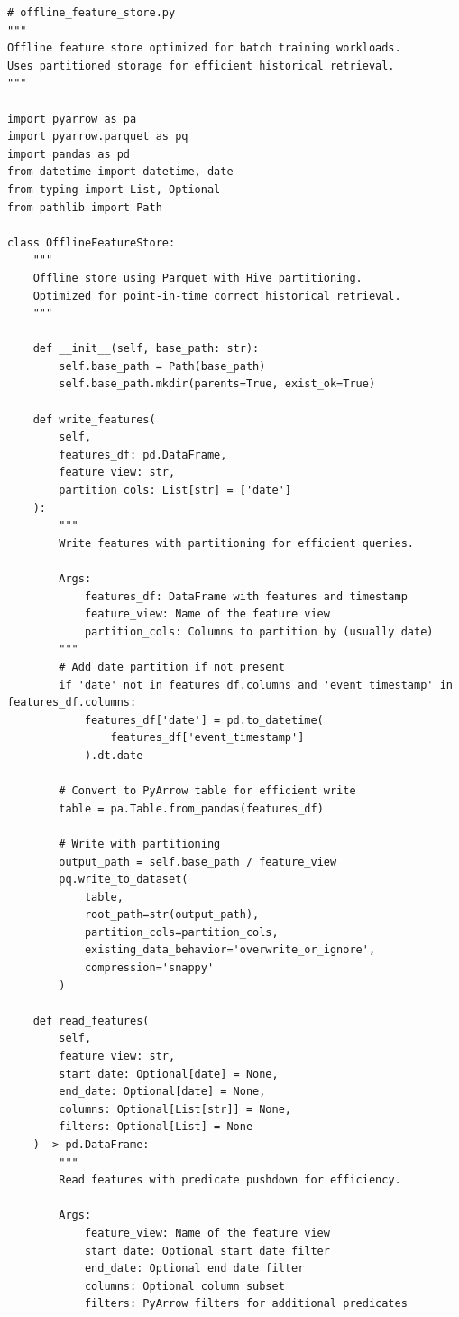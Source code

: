 \begin{lstlisting}[style=python, caption=Scalable offline feature store with partitioning]
# offline_feature_store.py
"""
Offline feature store optimized for batch training workloads.
Uses partitioned storage for efficient historical retrieval.
"""

import pyarrow as pa
import pyarrow.parquet as pq
import pandas as pd
from datetime import datetime, date
from typing import List, Optional
from pathlib import Path

class OfflineFeatureStore:
    """
    Offline store using Parquet with Hive partitioning.
    Optimized for point-in-time correct historical retrieval.
    """

    def __init__(self, base_path: str):
        self.base_path = Path(base_path)
        self.base_path.mkdir(parents=True, exist_ok=True)

    def write_features(
        self,
        features_df: pd.DataFrame,
        feature_view: str,
        partition_cols: List[str] = ['date']
    ):
        """
        Write features with partitioning for efficient queries.

        Args:
            features_df: DataFrame with features and timestamp
            feature_view: Name of the feature view
            partition_cols: Columns to partition by (usually date)
        """
        # Add date partition if not present
        if 'date' not in features_df.columns and 'event_timestamp' in features_df.columns:
            features_df['date'] = pd.to_datetime(
                features_df['event_timestamp']
            ).dt.date

        # Convert to PyArrow table for efficient write
        table = pa.Table.from_pandas(features_df)

        # Write with partitioning
        output_path = self.base_path / feature_view
        pq.write_to_dataset(
            table,
            root_path=str(output_path),
            partition_cols=partition_cols,
            existing_data_behavior='overwrite_or_ignore',
            compression='snappy'
        )

    def read_features(
        self,
        feature_view: str,
        start_date: Optional[date] = None,
        end_date: Optional[date] = None,
        columns: Optional[List[str]] = None,
        filters: Optional[List] = None
    ) -> pd.DataFrame:
        """
        Read features with predicate pushdown for efficiency.

        Args:
            feature_view: Name of the feature view
            start_date: Optional start date filter
            end_date: Optional end date filter
            columns: Optional column subset
            filters: PyArrow filters for additional predicates


\end{lstlisting}
